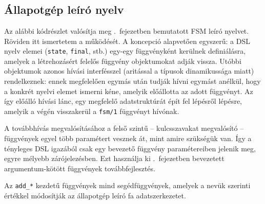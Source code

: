 \appendix
\chapter*{\fuggelek}
\setcounter{chapter}{\appendixnumber}

\section{Állapotgép leíró nyelv}\label{sec:app:fsm}

Az alábbi kódrészlet valósítja meg .~fejezetben bemutatott \gls{FSM} leíró nyelvet. 
Röviden itt ismertetem a működését. 
A koncepció alapvetően egyszerű: a \gls{DSL} nyelv elemei ({\tt state}, {\tt final}, stb.) egy-egy függvényként kerülnek definiálásra, amelyek a létrehozásért felelős függvény objektumokat adják vissza. Utóbbi objektumok azonos hívási interfésszel (aritással a típusok dinamikussága miatt) rendelkeznek: ennek megfelelően egymás után
tudják hívni egymást anélkül, hogy a konkrét nyelvi elemet ismerni kéne, amelyik előállotta az adott függvényt. 
Az így előálló hívási lánc, egy megfelelő adatstruktúrát épít fel lépésről lépésre, amelyik a végén visszakerül a {\tt fsm/1} függvényt hívónak.

A továbbhívás megvalósításához a felső szintű -- kulcsszavakat megvalósító -- függvények egyel több paramétert vesznek át, mint amire szükségük van. 
Így a tényleges \gls{DSL} igazából csak egy bevezető függvény paramétereiben jelenik meg, egyre mélyebb zárójelezésben.
Ezt használja ki .~fejezetben bevezetett argumentum-kötött függvények továbbfejlesztés.

Az {\tt add\_*} kezdetű függvények mind segédfüggvények, amelyek a nevük szerinti értékkel módosítják az állapotgép leíró fa adatszerkezetet.

